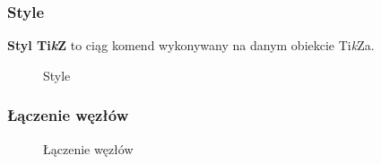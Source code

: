 \documentclass[10pt,t]{beamer}
\begin{document}
\begin{frame}
  \frametitle{Style}


  \textbf{Styl Ti\textit{k}Z} to ciąg komend wykonywany na danym
  obiekcie Ti\textit{k}Za.





  \begin{figure}

    \centering


    \begin{tikzpicture}





    \end{tikzpicture}


    \caption{Style}

  \end{figure}

\end{frame}





\begin{frame}
  \frametitle{Łączenie węzłów}


  \begin{figure}

    \centering


    \begin{tikzpicture}











    \end{tikzpicture}


    \caption{Łączenie węzłów}

  \end{figure}

\end{frame}
\end{document}
